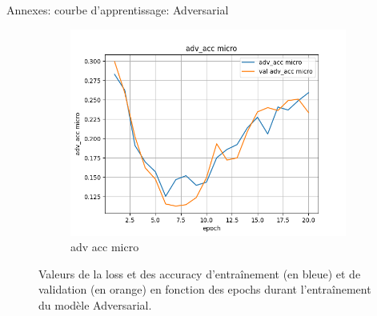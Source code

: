 \documentclass[11pt]{beamer}
\begin{document}
\begin{frame}{Annexes: courbe d'apprentissage: Adversarial}
\begin{figure}[ht]
        \begin{subfigure}{0.32\textwidth}
            \centering
            \includegraphics[width=\linewidth]{../logs/adv_img256_1/adv_acc micro.png}
            \caption{adv acc micro}
        \end{subfigure}
        \caption{Valeurs de la loss et des accuracy d'entraînement (en bleue) et de validation (en orange) en fonction des epochs durant l'entraînement du modèle Adversarial.}
        \label{fig: train adv}
    \end{figure}
\end{frame}
\end{document}

